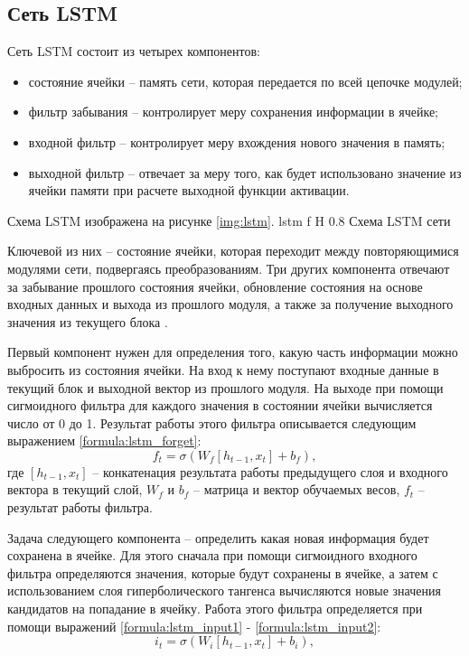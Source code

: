 \subsection{Сеть LSTM}
Сеть LSTM \cite{yu2019review} состоит из четырех компонентов:
\begin{itemize}
	\item состояние ячейки -- память сети, которая передается по всей цепочке модулей;
	\item фильтр забывания -- контролирует меру сохранения информации в ячейке;
	\item входной фильтр -- контролирует меру вхождения нового значения в память;
	\item выходной фильтр -- отвечает за меру того, как будет использовано значение из ячейки памяти при расчете выходной функции активации.
\end{itemize}

Схема LSTM изображена на рисунке \ref{img:lstm}.
{lstm} %
{f} %
{H} %
{0.8\textwidth} %
{Схема LSTM сети} %

Ключевой из них -- состояние ячейки, которая переходит между повторяющимися модулями сети, подвергаясь преобразованиям.
Три других компонента отвечают за забывание прошлого состояния ячейки, обновление состояния на основе входных данных и выхода из прошлого модуля, а также за получение выходного значения из текущего блока \cite{al2024rnn}.

Первый компонент нужен для определения того, какую часть информации можно выбросить из состояния ячейки.
На вход к нему поступают входные данные в текущий блок и выходной вектор из прошлого модуля.
На выходе при помощи сигмоидного фильтра для каждого значения в состоянии ячейки вычисляется число от 0 до 1.
Результат работы этого фильтра описывается следующим выражением \ref{formula:lstm_forget}:
\begin{equation}\label{formula:lstm_forget}
	f_t = \sigma(W_f[h_{t-1}, x_t] + b_f),
\end{equation}
где $[h_{t-1}, x_t]$ -- конкатенация результата работы предыдущего слоя и входного вектора в текущий слой, $W_f$ и $b_f$ -- матрица и вектор обучаемых весов, $f_t$ -- результат работы фильтра.

Задача следующего компонента -- определить какая новая информация будет сохранена в ячейке.
Для этого сначала при помощи сигмоидного входного фильтра определяются значения, которые будут сохранены в ячейке, а затем с использованием слоя гиперболического тангенса вычисляются новые значения кандидатов на попадание в ячейку.
Работа этого фильтра определяется при помощи выражений \ref{formula:lstm_input1} - \ref{formula:lstm_input2}:
\begin{equation}\label{formula:lstm_input1}
	i_t = \sigma(W_i[h_{t-1}, x_t] + b_i),
\end{equation}

